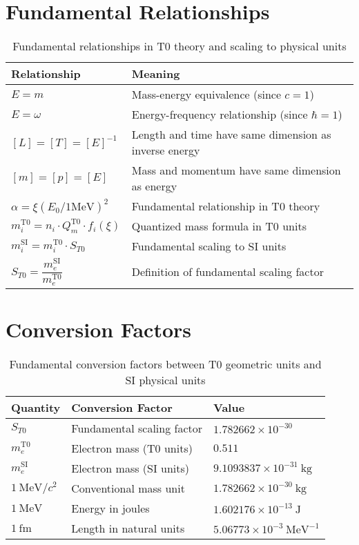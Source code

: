 \documentclass[12pt,a4paper]{article}
\begin{document}
	\section{Fundamental Relationships}
	
	\begin{table}[h]
		\centering
		\begin{tabular}{p{4cm}p{10cm}}
			\toprule
			\textbf{Relationship} & \textbf{Meaning} \\
			\midrule
			$E = m$ & Mass-energy equivalence (since $c=1$) \\
			$E = \omega$ & Energy-frequency relationship (since $\hbar=1$) \\
			$[L] = [T] = [E]^{-1}$ & Length and time have same dimension as inverse energy \\
			$[m] = [p] = [E]$ & Mass and momentum have same dimension as energy \\
			$\alpha = \xi (E_0/1\mathrm{MeV})^2$ & Fundamental relationship in T0 theory \\
			$m_i^{\mathrm{T0}} = n_i \cdot Q_m^{\mathrm{T0}} \cdot f_i(\xi)$ & Quantized mass formula in T0 units \\
			$m_i^{\mathrm{SI}} = m_i^{\mathrm{T0}} \cdot S_{T0}$ & Fundamental scaling to SI units \\
			$S_{T0} = \dfrac{m_e^{\mathrm{SI}}}{m_e^{\mathrm{T0}}}$ & Definition of fundamental scaling factor \\
			\bottomrule
		\end{tabular}
		\caption{Fundamental relationships in T0 theory and scaling to physical units}
	\end{table}
	
	\section{Conversion Factors}
	
	\begin{table}[h]
		\centering
		\begin{tabular}{lll}
			\toprule
			\textbf{Quantity} & \textbf{Conversion Factor} & \textbf{Value} \\
			\midrule
			$S_{T0}$ & Fundamental scaling factor & $1.782662 \times 10^{-30}$ \\
			$m_e^{\mathrm{T0}}$ & Electron mass (T0 units) & $0.511$ \\
			$m_e^{\mathrm{SI}}$ & Electron mass (SI units) & $9.1093837 \times 10^{-31}~\mathrm{kg}$ \\
			$1~\mathrm{MeV}/c^2$ & Conventional mass unit & $1.782662 \times 10^{-30}~\mathrm{kg}$ \\
			$1~\mathrm{MeV}$ & Energy in joules & $1.602176 \times 10^{-13}~\mathrm{J}$ \\
			$1~\mathrm{fm}$ & Length in natural units & $5.06773 \times 10^{-3}~\mathrm{MeV}^{-1}$ \\
			\bottomrule
		\end{tabular}
		\caption{Fundamental conversion factors between T0 geometric units and SI physical units}
	\end{table}
	
\end{document}
